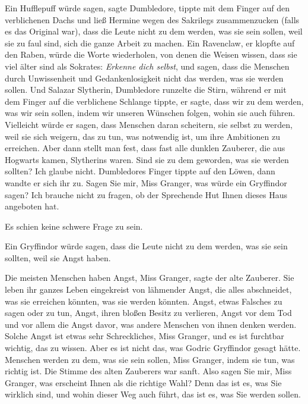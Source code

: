\glqq{}Ein Hufflepuff würde sagen\grqq{}, sagte Dumbledore, tippte mit dem Finger
auf den verblichenen Dachs und ließ Hermine wegen des Sakrilegs zusammenzucken
(falls es das Original war), \glqq{}dass die Leute nicht zu dem werden, was sie
sein sollen, weil sie zu faul sind, sich die ganze Arbeit zu machen. Ein
Ravenclaw\grqq{}, er klopfte auf den Raben, \glqq{}würde die Worte wiederholen,
von denen die Weisen wissen, dass sie viel älter sind als Sokrates:
\emph{Erkenne dich selbst}, und sagen, dass die Menschen durch Unwissenheit und
Gedankenlosigkeit nicht das werden, was sie werden sollen. Und Salazar
Slytherin\grqq{}, Dumbledore runzelte die Stirn, während er mit dem Finger auf
die verblichene Schlange tippte, \glqq{}er sagte, dass wir zu dem werden, was wir
sein sollen, indem wir unseren Wünschen folgen, wohin sie auch führen.
Vielleicht würde er sagen, dass Menschen daran scheitern, sie selbst zu werden,
weil sie sich weigern, das zu tun, was notwendig ist, um ihre Ambitionen zu
erreichen. Aber dann stellt man fest, dass fast alle dunklen Zauberer, die aus
Hogwarts kamen, Slytherins waren. Sind sie zu dem geworden, was sie werden
sollten? Ich glaube nicht.\grqq{} Dumbledores Finger tippte auf den Löwen, dann
wandte er sich ihr zu. \glqq{}Sagen Sie mir, Miss Granger, was würde ein
Gryffindor sagen? Ich brauche nicht zu fragen, ob der Sprechende Hut Ihnen
dieses Haus angeboten hat.\grqq{}

Es schien keine schwere Frage zu sein.

\glqq{}Ein Gryffindor würde sagen, dass die Leute nicht zu dem werden, was sie
sein sollten, weil sie Angst haben.\grqq{}

\glqq{}Die meisten Menschen haben Angst, Miss Granger\grqq{}, sagte der alte
Zauberer. \glqq{}Sie leben ihr ganzes Leben eingekreist von lähmender Angst, die
alles abschneidet, was sie erreichen könnten, was sie werden könnten. Angst,
etwas Falsches zu sagen oder zu tun, Angst, ihren bloßen Besitz zu verlieren,
Angst vor dem Tod und vor allem die Angst davor, was andere Menschen von ihnen
denken werden. Solche Angst ist etwas sehr Schreckliches, Miss Granger, und es
ist furchtbar wichtig, das zu wissen. Aber es ist nicht das, was Godric
Gryffindor gesagt hätte. Menschen werden zu dem, was sie sein sollen, Miss
Granger, indem sie tun, was richtig ist.\grqq{} Die Stimme des alten Zauberers
war sanft. \glqq{}Also sagen Sie mir, Miss Granger, was erscheint Ihnen als die
richtige Wahl? Denn das ist es, was Sie wirklich sind, und wohin dieser Weg auch
führt, das ist es, was Sie werden sollen.\grqq{}


